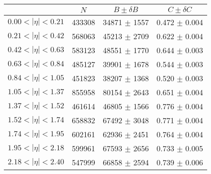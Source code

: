 \begin{tabular}{lccc}
\hline
    &   $N$   & $B \pm \delta B$  &  $C \pm \delta C$ \\
\hline
$0.00 < |\eta| <0.21$          & 433308     & 34871      $\pm$ 1557 & 0.472      $\pm$ 0.004 \\
$0.21 < |\eta| <0.42$          & 568063     & 45213      $\pm$ 2709 & 0.622      $\pm$ 0.004 \\
$0.42 < |\eta| <0.63$          & 583123     & 48551      $\pm$ 1770 & 0.644      $\pm$ 0.003 \\
$0.63 < |\eta| <0.84$          & 485127     & 39901      $\pm$ 1678 & 0.544      $\pm$ 0.003 \\
$0.84 < |\eta| <1.05$          & 451823     & 38207      $\pm$ 1368 & 0.520      $\pm$ 0.003 \\
$1.05 < |\eta| <1.37$          & 855958     & 80154      $\pm$ 2643 & 0.651      $\pm$ 0.004 \\
$1.37 < |\eta| <1.52$          & 461614     & 46805      $\pm$ 1566 & 0.776      $\pm$ 0.004 \\
$1.52 < |\eta| <1.74$          & 658832     & 67492      $\pm$ 3048 & 0.771      $\pm$ 0.004 \\
$1.74 < |\eta| <1.95$          & 602161     & 62936      $\pm$ 2451 & 0.764      $\pm$ 0.004 \\
$1.95 < |\eta| <2.18$          & 599961     & 67593      $\pm$ 2656 & 0.733      $\pm$ 0.005 \\
$2.18 < |\eta| <2.40$          & 547999     & 66858      $\pm$ 2594 & 0.739      $\pm$ 0.006 \\
\hline
\end{tabular}
